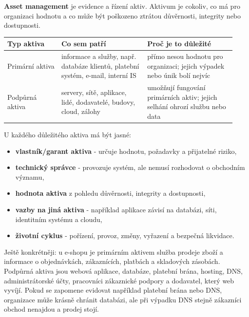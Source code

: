 \textbf{Asset management} je evidence a řízení aktiv. Aktivum je cokoliv, co má pro organizaci hodnotu a co může být poškozeno ztrátou důvěrnosti, integrity nebo dostupnosti.

\begin{longtable}{p{0.22\linewidth}p{0.35\linewidth}p{0.36\linewidth}}
\toprule
\textbf{Typ aktiva} & \textbf{Co sem patří} & \textbf{Proč je to důležité} \\
\midrule\endhead
Primární aktiva & informace a služby, např. databáze klientů, platební systém, e-mail, interní IS & přímo nesou hodnotu pro organizaci; jejich výpadek nebo únik bolí nejvíc \\
\addlinespace
Podpůrná aktiva & servery, sítě, aplikace, lidé, dodavatelé, budovy, cloud, zálohy & umožňují fungování primárních aktiv; jejich selhání ohrozí službu nebo data \\
\bottomrule
\end{longtable}

U každého důležitého aktiva má být jasné:
\begin{itemize}
    \item \textbf{vlastník/garant aktiva} - určuje hodnotu, požadavky a přijatelné riziko,
    \item \textbf{technický správce} - provozuje systém, ale nemusí rozhodovat o obchodním významu,
    \item \textbf{hodnota aktiva} z pohledu důvěrnosti, integrity a dostupnosti,
    \item \textbf{vazby na jiná aktiva} - například aplikace závisí na databázi, síti, identitním systému a cloudu,
    \item \textbf{životní cyklus} - pořízení, provoz, změny, vyřazení a bezpečná likvidace.
\end{itemize}


Ještě konkrétněji: u e-shopu je primárním aktivem služba prodeje zboží a informace o objednávkách, zákaznících, platbách a skladových zásobách. Podpůrná aktiva jsou webová aplikace, databáze, platební brána, hosting, DNS, administrátorské účty, pracovníci zákaznické podpory a dodavatel, který web vyvíjí. Pokud se zapomene evidovat například platební brána nebo DNS, organizace může krásně chránit databázi, ale při výpadku DNS stejně zákazníci obchod nenajdou a prodej stojí.

